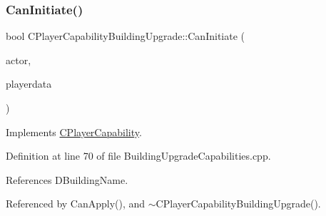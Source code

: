 \subsubsection{\texorpdfstring{Can\+Initiate()}{CanInitiate()}}
{\footnotesize\ttfamily bool C\+Player\+Capability\+Building\+Upgrade\+::\+Can\+Initiate (\begin{DoxyParamCaption}\item[{std\+::shared\+\_\+ptr$<$ \hyperlink{classCPlayerAsset}{C\+Player\+Asset} $>$}]{actor,  }\item[{std\+::shared\+\_\+ptr$<$ \hyperlink{classCPlayerData}{C\+Player\+Data} $>$}]{playerdata }\end{DoxyParamCaption})\hspace{0.3cm}{\ttfamily [virtual]}}



Implements \hyperlink{classCPlayerCapability_aa83b1e1fcaff2985c378132d679154ea}{C\+Player\+Capability}.



Definition at line 70 of file Building\+Upgrade\+Capabilities.\+cpp.



References D\+Building\+Name.



Referenced by Can\+Apply(), and $\sim$\+C\+Player\+Capability\+Building\+Upgrade().


